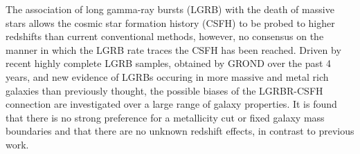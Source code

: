 


\bigskip



\bigskip

\noindent The association of long gamma-ray bursts (LGRB) with the death of massive stars allows the cosmic star formation history (CSFH) to be probed to higher redshifts than current conventional methods, however, no consensus on the manner in which the LGRB rate traces the CSFH has been reached. Driven by recent highly complete LGRB samples, obtained by GROND over the past 4 years, and new evidence of LGRBs occuring in more massive and metal rich galaxies than previously thought, the possible biases of the LGRBR-CSFH connection are investigated over a large range of galaxy properties. It is found that there is no strong preference for a metallicity cut or fixed galaxy mass boundaries and that there are no unknown redshift effects, in contrast to previous work.

